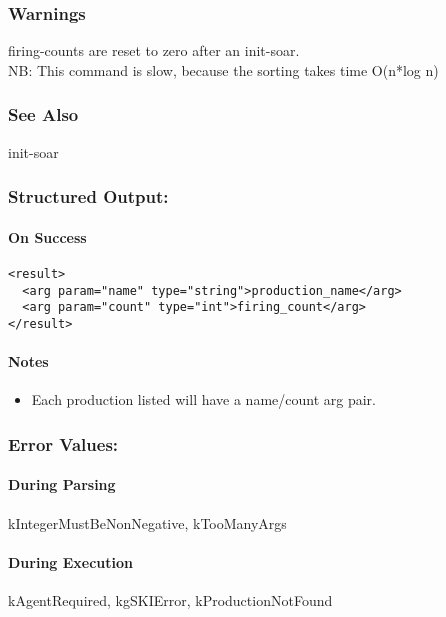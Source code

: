 \subsubsection*{Warnings}
 firing-counts are reset to zero after an init-soar. \\ 
 NB: This command is slow, because the sorting takes time O(n*log n) 
\subsubsection*{See Also}
 init-soar
\subsubsection*{Structured Output:}
\paragraph*{On Success}
\begin{verbatim}
<result>
  <arg param="name" type="string">production_name</arg>
  <arg param="count" type="int">firing_count</arg>
</result>
\end{verbatim}
\paragraph*{Notes}
\begin{itemize}
\item  Each production listed will have a name/count arg pair. 
\end{itemize}
\subsubsection*{Error Values:}
\paragraph*{During Parsing}
 kIntegerMustBeNonNegative, kTooManyArgs
\paragraph*{During Execution}
 kAgentRequired, kgSKIError, kProductionNotFound
